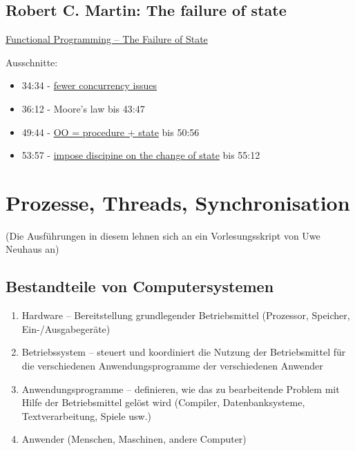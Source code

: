 \documentclass[11pt]{article}
\begin{document}
\subsection*{Robert C. Martin: The failure of state}
\label{sec:org9bbb745}
\href{https://www.youtube.com/watch?v=7Zlp9rKHGD4}{Functional Programming -- The Failure of State}

Ausschnitte:
\begin{itemize}
\item 34:34 - \href{https://www.youtube.com/watch?v=7Zlp9rKHGD4\&t=2074s}{fewer concurrency issues}
\item 36:12 - Moore's law bis 43:47
\item 49:44 - \href{https://www.youtube.com/watch?v=7Zlp9rKHGD4\&t=2984s}{OO = procedure + state} bis 50:56
\item 53:57 - \href{https://www.youtube.com/watch?v=7Zlp9rKHGD4\&t=3237s}{impose  discipine on the change of state} bis 55:12
\end{itemize}

\section*{Prozesse, Threads, Synchronisation}
\label{sec:org32848d1}
(Die Ausführungen in diesem lehnen sich an ein Vorlesungsskript von
Uwe Neuhaus an)
\subsection*{Bestandteile von Computersystemen}
\label{sec:org564125a}
\begin{enumerate}
\item Hardware – Bereitstellung grundlegender Betriebsmittel (Prozessor,
Speicher, Ein-/Ausgabegeräte)
\item Betriebssystem – steuert und koordiniert die Nutzung der
Betriebsmittel für die verschiedenen Anwendungsprogramme der
verschiedenen Anwender
\item Anwendungsprogramme – definieren, wie das zu bearbeitende Problem
mit Hilfe der Betriebsmittel gelöst wird (Compiler,
Datenbanksysteme, Textverarbeitung, Spiele usw.)
\item Anwender (Menschen, Maschinen, andere Computer)
\end{enumerate}
\end{document}
